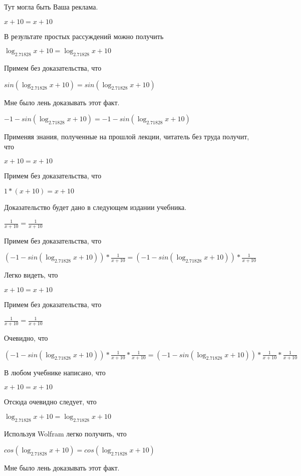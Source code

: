\documentclass[12pt,a4paper,fleqn]{article}
\theoremstyle{definition}
\begin{document}
Тут могла быть Ваша реклама. 

$ x  +  10  =  x  +  10 $

В результате простых рассуждений можно получить 

$\log_{ 2.71828 }{ x  +  10 } = \log_{ 2.71828 }{ x  +  10 }$

Примем без доказательства, что 

$sin(\log_{ 2.71828 }{ x  +  10 }) = sin(\log_{ 2.71828 }{ x  +  10 })$

Мне было лень доказывать этот факт.

$ -1  - sin(\log_{ 2.71828 }{ x  +  10 }) =  -1  - sin(\log_{ 2.71828 }{ x  +  10 })$

Применяя знания, полученные на прошлой лекции, читатель без труда получит, что 

$ x  +  10  =  x  +  10 $

Примем без доказательства, что 

$ 1  * ( x  +  10 ) =  x  +  10 $

Доказательство будет дано в следующем издании учебника. 

$\frac{ 1 }{ x  +  10 }
 = \frac{ 1 }{ x  +  10 }
$

Примем без доказательства, что 

$( -1  - sin(\log_{ 2.71828 }{ x  +  10 })) * \frac{ 1 }{ x  +  10 }
 = ( -1  - sin(\log_{ 2.71828 }{ x  +  10 })) * \frac{ 1 }{ x  +  10 }
$

Легко видеть, что 

$ x  +  10  =  x  +  10 $

Примем без доказательства, что 

$\frac{ 1 }{ x  +  10 }
 = \frac{ 1 }{ x  +  10 }
$

Очевидно, что 

$( -1  - sin(\log_{ 2.71828 }{ x  +  10 })) * \frac{ 1 }{ x  +  10 }
 * \frac{ 1 }{ x  +  10 }
 = ( -1  - sin(\log_{ 2.71828 }{ x  +  10 })) * \frac{ 1 }{ x  +  10 }
 * \frac{ 1 }{ x  +  10 }
$

В любом учебнике написано, что 

$ x  +  10  =  x  +  10 $

Отсюда очевидно следует, что 

$\log_{ 2.71828 }{ x  +  10 } = \log_{ 2.71828 }{ x  +  10 }$

Используя Wolfram легко получить, что 

$cos(\log_{ 2.71828 }{ x  +  10 }) = cos(\log_{ 2.71828 }{ x  +  10 })$

Мне было лень доказывать этот факт.
\end{document}
